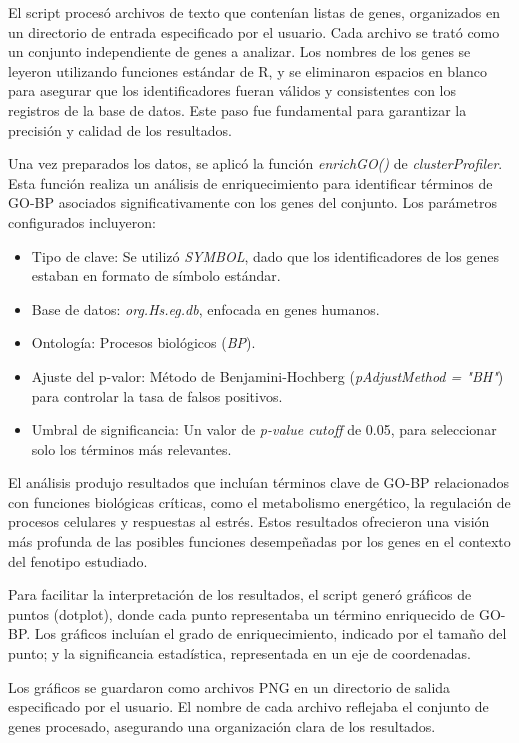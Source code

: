 El script procesó archivos de texto que contenían listas de genes, organizados en un directorio de entrada especificado por el usuario. Cada archivo se trató como un conjunto independiente de genes a analizar. Los nombres de los genes se leyeron utilizando funciones estándar de R, y se eliminaron espacios en blanco para asegurar que los identificadores fueran válidos y consistentes con los registros de la base de datos. Este paso fue fundamental para garantizar la precisión y calidad de los resultados.

Una vez preparados los datos, se aplicó la función \textit{enrichGO()} de \textit{clusterProfiler}. Esta función realiza un análisis de enriquecimiento para identificar términos de GO-BP asociados significativamente con los genes del conjunto. Los parámetros configurados incluyeron:

\begin{itemize}
	\item Tipo de clave: Se utilizó \textit{SYMBOL}, dado que los identificadores de los genes estaban en formato de símbolo estándar.
	\item Base de datos: \textit{org.Hs.eg.db}, enfocada en genes humanos.
	\item Ontología: Procesos biológicos (\textit{BP}).
	\item Ajuste del p-valor: Método de Benjamini-Hochberg (\textit{pAdjustMethod = "BH"}) para controlar la tasa de falsos positivos.
	\item Umbral de significancia: Un valor de \textit{p-value cutoff} de 0.05, para seleccionar solo los términos más relevantes.
\end{itemize}

El análisis produjo resultados que incluían términos clave de GO-BP relacionados con funciones biológicas críticas, como el metabolismo energético, la regulación de procesos celulares y respuestas al estrés. Estos resultados ofrecieron una visión más profunda de las posibles funciones desempeñadas por los genes en el contexto del fenotipo estudiado.

Para facilitar la interpretación de los resultados, el script generó gráficos de puntos (dotplot), donde cada punto representaba un término enriquecido de GO-BP. Los gráficos incluían el grado de enriquecimiento, indicado por el tamaño del punto; y la significancia estadística, representada en un eje de coordenadas.

Los gráficos se guardaron como archivos PNG en un directorio de salida especificado por el usuario. El nombre de cada archivo reflejaba el conjunto de genes procesado, asegurando una organización clara de los resultados.

